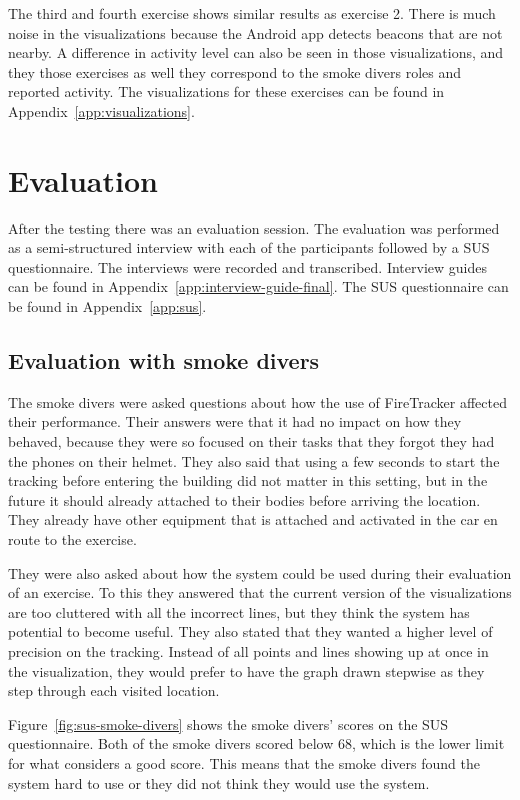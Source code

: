 \documentclass[../Main/thesis.tex]{subfiles}
\begin{document}
The third and fourth exercise shows similar results as exercise 2.
There is much noise in the visualizations because the Android app detects beacons that are not nearby.
A difference in activity level can also be seen in those visualizations, and they those exercises as well they correspond to the smoke divers roles and reported activity.
The visualizations for these exercises can be found in Appendix~\ref{app:visualizations}.

\section{Evaluation}
After the testing there was an evaluation session.
The evaluation was performed as a semi-structured interview with each of the participants followed by a SUS questionnaire.
The interviews were recorded and transcribed.
Interview guides can be found in Appendix~\ref{app:interview-guide-final}.
The SUS questionnaire can be found in Appendix~\ref{app:sus}.

\subsection{Evaluation with smoke divers}
The smoke divers were asked questions about how the use of FireTracker affected their performance.
Their answers were that it had no impact on how they behaved, because they were so focused on their tasks that they forgot they had the phones on their helmet.
They also said that using a few seconds to start the tracking before entering the building did not matter in this setting, but in the future it should already attached to their bodies before arriving the location.
They already have other equipment that is attached and activated in the car en route to the exercise.

They were also asked about how the system could be used during their evaluation of an exercise.
To this they answered that the current version of the visualizations are too cluttered with all the incorrect lines, but they think the system has potential to become useful.
They also stated that they wanted a higher level of precision on the tracking.
Instead of all points and lines showing up at once in the visualization, they would prefer to have the graph drawn stepwise as they step through each visited location.

Figure~\ref{fig:sus-smoke-divers} shows the smoke divers' scores on the SUS questionnaire.
Both of the smoke divers scored below 68, which is the lower limit for what \citet{Brooke2013} considers a good score.
This means that the smoke divers found the system hard to use or they did not think they would use the system.
\end{document}
